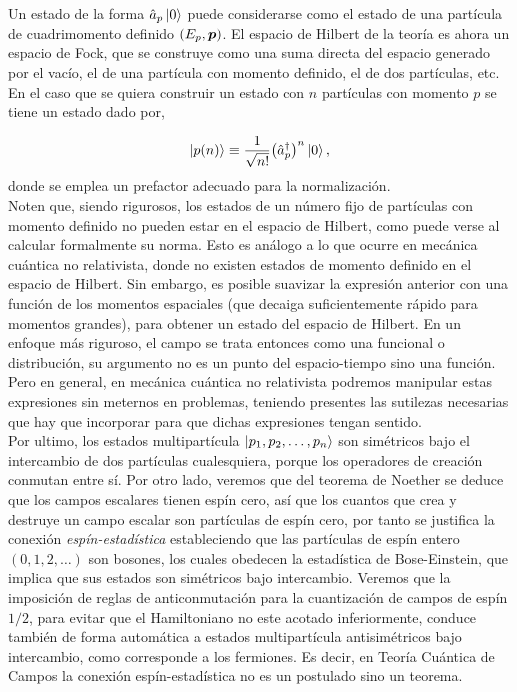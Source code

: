 Un estado de la forma $\hat{a}_p \ket{0}$ puede considerarse como el estado de una partícula de cuadrimomento definido $(E_p,\vb*{p})$. El espacio de Hilbert de la teoría es ahora un espacio de Fock, que se construye como una suma directa del espacio generado por el vacío, el de una partícula con momento definido, el de dos partículas, etc. En el caso que se quiera construir un estado con $n$ partículas con momento $p$ se tiene un estado dado por,

\begin{equation}
    \ket{p(n)}\equiv \frac{1}{\sqrt{n!}}\qty(\hat{a}^\dag_p)^n\ket{0},
\end{equation}
donde se emplea un prefactor adecuado para la normalización.\\

Noten que, siendo rigurosos, los estados de un número fijo de partículas con momento definido no pueden estar en el espacio de Hilbert, como puede verse al calcular formalmente su norma. Esto es análogo a lo que ocurre en mecánica cuántica no relativista, donde no existen estados de momento definido en el espacio de Hilbert. Sin embargo, es posible suavizar la expresión anterior con una función de los momentos espaciales (que decaiga suficientemente rápido para momentos grandes), para obtener un estado del espacio de Hilbert. En un enfoque más riguroso, el campo se trata entonces como una funcional o distribución, su argumento no es un punto del espacio-tiempo sino una función. Pero en general, en mecánica cuántica no relativista podremos manipular estas expresiones sin meternos en problemas, teniendo presentes las sutilezas necesarias que hay que incorporar para que dichas expresiones tengan sentido.\\

Por ultimo, los estados multipartícula $\ket{p_1,p_2,\ldots,p_n}$ son simétricos bajo el intercambio de dos partículas cualesquiera, porque los operadores de creación conmutan entre sí. Por otro lado, veremos que del teorema de Noether se deduce que los campos escalares tienen espín cero, así que los cuantos que crea y destruye un campo escalar son partículas de espín cero, por tanto se justifica la conexión \emph{espín-estadística} estableciendo que las partículas de espín entero $(0,1,2,\ldots)$ son bosones, los cuales obedecen la estadística de Bose-Einstein, que implica que sus estados son simétricos bajo intercambio. Veremos que la imposición de reglas de anticonmutación para la cuantización de campos de espín $1/2$, para evitar que el Hamiltoniano no este acotado inferiormente, conduce también de forma automática a estados multipartícula antisimétricos bajo intercambio, como corresponde a los fermiones. Es decir, en Teoría Cuántica de Campos la conexión espín-estadística no es un postulado sino un teorema.

